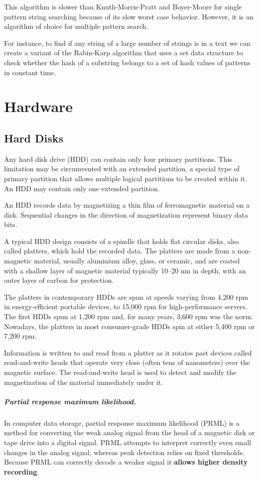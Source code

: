 \documentclass[oneside]{book}
\begin{document}
This algorithm is slower than Knuth-Morris-Pratt and Boyer-Moore for single
pattern string searching because of its slow worst case behavior. However, it is
an algorithm of choice for multiple pattern search.

For instance, to find if any string of a large number of strings is in a text we
can create a variant of the Rabin-Karp algorithm that uses a set data structure
to check whether the hash of a substring belongs to a set of hash values of
patterns in constant time.

\chapter{Hardware}
\section{Hard Disks}
Any hard disk drive (HDD) can contain only four primary partitions. This
limitation may be circumvented with an extended partition, a special type of
primary partition that allows multiple logical partitions to be created within
it. An HDD may contain only one extended partition.

An HDD records data by magnetizing a thin film of ferromagnetic material on a
disk. Sequential changes in the direction of magnetization represent binary
data bits.

A typical HDD design consists of a spindle that holds flat circular disks, also
called platters, which hold the recorded data. The platters are made from a
non-magnetic material, usually aluminium alloy, glass, or ceramic, and are
coated with a shallow layer of magnetic material typically 10–20 nm in depth,
with an outer layer of carbon for protection.

The platters in contemporary HDDs are spun at speeds varying from 4,200 rpm in
energy-efficient portable devices, to 15,000 rpm for high-performance servers.
The first HDDs spun at 1,200 rpm and, for many years, 3,600 rpm was the norm.
Nowadays, the platters in most consumer-grade HDDs spin at either 5,400 rpm or
7,200 rpm.

Information is written to and read from a platter as it rotates past devices
called read-and-write heads that operate very close (often tens of nanometers)
over the magnetic surface. The read-and-write head is used to detect and modify
the magnetization of the material immediately under it.

\paragraph{Partial response maximum likelihood.} In computer data storage,
partial response maximum likelihood (PRML) is a method for converting the weak
analog signal from the head of a magnetic disk or tape drive into a digital
signal. PRML attempts to interpret correctly even small changes in the analog
signal, whereas peak detection relies on fixed thresholds. Because PRML can
correctly decode a weaker signal it \textbf{allows higher density recording}.
\end{document}
